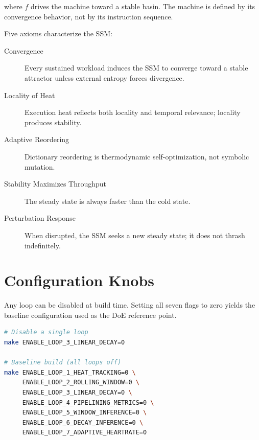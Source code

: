 where $f$ drives the machine toward a stable basin. The machine is defined by
its convergence behavior, not by its instruction sequence.

Five axioms characterize the SSM:

\begin{description}
  \item[Convergence] Every sustained workload induces the SSM to converge
    toward a stable attractor unless external entropy forces divergence.
  \item[Locality of Heat] Execution heat reflects both locality and temporal
    relevance; locality produces stability.
  \item[Adaptive Reordering] Dictionary reordering is thermodynamic
    self-optimization, not symbolic mutation.
  \item[Stability Maximizes Throughput] The steady state is always faster
    than the cold state.
  \item[Perturbation Response] When disrupted, the SSM seeks a new steady
    state; it does not thrash indefinitely.
\end{description}

\section{Configuration Knobs}
\label{vol1:sec:physics:knobs}


Any loop can be disabled at build time. Setting all seven flags to zero yields
the baseline configuration used as the DoE reference point.

\begin{lstlisting}[language=bash]
# Disable a single loop
make ENABLE_LOOP_3_LINEAR_DECAY=0

# Baseline build (all loops off)
make ENABLE_LOOP_1_HEAT_TRACKING=0 \
     ENABLE_LOOP_2_ROLLING_WINDOW=0 \
     ENABLE_LOOP_3_LINEAR_DECAY=0 \
     ENABLE_LOOP_4_PIPELINING_METRICS=0 \
     ENABLE_LOOP_5_WINDOW_INFERENCE=0 \
     ENABLE_LOOP_6_DECAY_INFERENCE=0 \
     ENABLE_LOOP_7_ADAPTIVE_HEARTRATE=0
\end{lstlisting}

